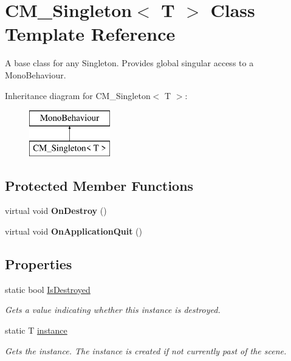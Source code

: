\hypertarget{class_c_m___singleton}{}\section{C\+M\+\_\+\+Singleton$<$ T $>$ Class Template Reference}
\label{class_c_m___singleton}


A base class for any Singleton. Provides global singular access to a Mono\+Behaviour.  


Inheritance diagram for C\+M\+\_\+\+Singleton$<$ T $>$\+:\begin{figure}[H]
\begin{center}
\leavevmode
\includegraphics[height=2.000000cm]{class_c_m___singleton}
\end{center}
\end{figure}
\subsection*{Protected Member Functions}
\begin{DoxyCompactItemize}
\item 
\hypertarget{class_c_m___singleton_af232ba062023581cc42e779598abe148}{}virtual void {\bfseries On\+Destroy} ()\label{class_c_m___singleton_af232ba062023581cc42e779598abe148}

\item 
\hypertarget{class_c_m___singleton_a902c7afbd9bfce107ff99c137dbf8d5f}{}virtual void {\bfseries On\+Application\+Quit} ()\label{class_c_m___singleton_a902c7afbd9bfce107ff99c137dbf8d5f}

\end{DoxyCompactItemize}
\subsection*{Properties}
\begin{DoxyCompactItemize}
\item 
static bool \hyperlink{class_c_m___singleton_a2d488ea5c08e0b2a2bd78e3e8658f0d4}{Is\+Destroyed}
\begin{DoxyCompactList}\small\item\em Gets a value indicating whether this instance is destroyed. \end{DoxyCompactList}\item 
static T \hyperlink{class_c_m___singleton_af2377c7977dd169962d9b76dc0fb2f45}{instance}
\begin{DoxyCompactList}\small\item\em Gets the instance. The instance is created if not currently past of the scene. \end{DoxyCompactList}\end{DoxyCompactItemize}


